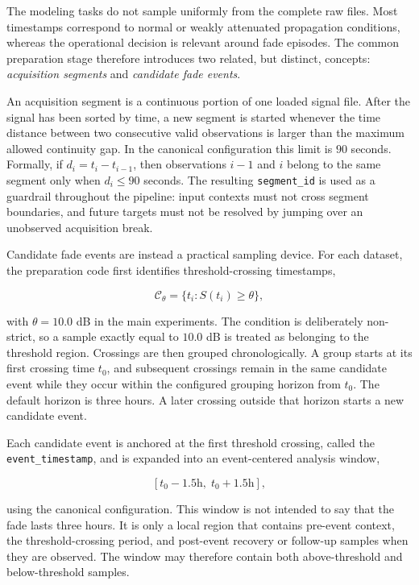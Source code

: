 The modeling tasks do not sample uniformly from the complete raw files. Most
timestamps correspond to normal or weakly attenuated propagation conditions,
whereas the operational decision is relevant around fade episodes. The common
preparation stage therefore introduces two related, but distinct, concepts:
\emph{acquisition segments} and \emph{candidate fade events}.

An acquisition segment is a continuous portion of one loaded signal file. After
the signal has been sorted by time, a new segment is started whenever the time
distance between two consecutive valid observations is larger than the maximum
allowed continuity gap. In the canonical configuration this limit is
\(90\) seconds. Formally, if \(d_i=t_i-t_{i-1}\), then observations \(i-1\) and
\(i\) belong to the same segment only when \(d_i \leq 90\) seconds. The resulting
\texttt{segment\_id} is used as a guardrail throughout the pipeline: input
contexts must not cross segment boundaries, and future targets must not be
resolved by jumping over an unobserved acquisition break.

Candidate fade events are instead a practical sampling device. For each dataset,
the preparation code first identifies threshold-crossing timestamps,

\[
  \mathcal{C}_{\theta} = \{t_i : S(t_i) \geq \theta\},
\]

with \(\theta=10.0\) dB in the main experiments. The condition is deliberately
non-strict, so a sample exactly equal to \(10.0\) dB is treated as belonging to
the threshold region. Crossings are then grouped chronologically. A group starts
at its first crossing time \(t_0\), and subsequent crossings remain in the same
candidate event while they occur within the configured grouping horizon from
\(t_0\). The default horizon is three hours. A later crossing outside that
horizon starts a new candidate event.

Each candidate event is anchored at the first threshold crossing, called the
\texttt{event\_timestamp}, and is expanded into an event-centered analysis window,

\[
  [t_0 - 1.5\text{h},\; t_0 + 1.5\text{h}],
\]

using the canonical configuration. This window is not intended to say that the
fade lasts three hours. It is only a local region that contains pre-event
context, the threshold-crossing period, and post-event recovery or follow-up
samples when they are observed. The window may therefore contain both
above-threshold and below-threshold samples.

